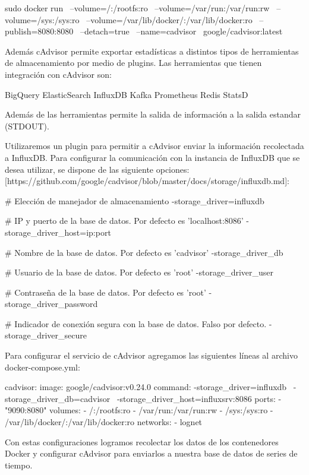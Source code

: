 sudo docker run \
  --volume=/:/rootfs:ro \
  --volume=/var/run:/var/run:rw \
  --volume=/sys:/sys:ro \
  --volume=/var/lib/docker/:/var/lib/docker:ro \
  --publish=8080:8080 \
  --detach=true \
  --name=cadvisor \
  google/cadvisor:latest


Además cAdvisor permite exportar estadísticas a distintos tipos de herramientas de almacenamiento por medio de plugins. Las herramientas que tienen integración con cAdvisor son:

BigQuery
ElasticSearch
InfluxDB
Kafka
Prometheus
Redis
StatsD

Además de las herramientas permite la salida de información a la salida estandar (STDOUT).

Utilizaremos un plugin para permitir a cAdvisor enviar la información recolectada a InfluxDB. Para configurar la comunicación con la instancia de InfluxDB que se desea utilizar, se dispone de las siguiente opciones: [https://github.com/google/cadvisor/blob/master/docs/storage/influxdb.md]:

# Elección de manejador de almacenamiento
 -storage_driver=influxdb

# IP y puerto de la base de datos. Por defecto es 'localhost:8086'
 -storage_driver_host=ip:port


# Nombre de la base de datos. Por defecto es 'cadvisor'
 -storage_driver_db

# Usuario de la base de datos. Por defecto es 'root'
 -storage_driver_user

# Contraseña de la base de datos. Por defecto es 'root'
 -storage_driver_password

# Indicador de conexión segura con la base de datos. Falso por defecto.
 -storage_driver_secure

Para configurar el servicio de cAdvisor agregamos las siguientes líneas al archivo docker-compose.yml:

  cadvisor:
    image: google/cadvisor:v0.24.0
    command: -storage_driver=influxdb \
             -storage_driver_db=cadvisor \
             -storage_driver_host=influxsrv:8086
    ports:
      - "9090:8080"
    volumes:
      - /:/rootfs:ro
      - /var/run:/var/run:rw
      - /sys:/sys:ro
      - /var/lib/docker/:/var/lib/docker:ro
    networks:
      - lognet

Con estas configuraciones logramos recolectar los datos de los contenedores Docker y configurar cAdvisor para enviarlos a nuestra base de datos de series de tiempo.

